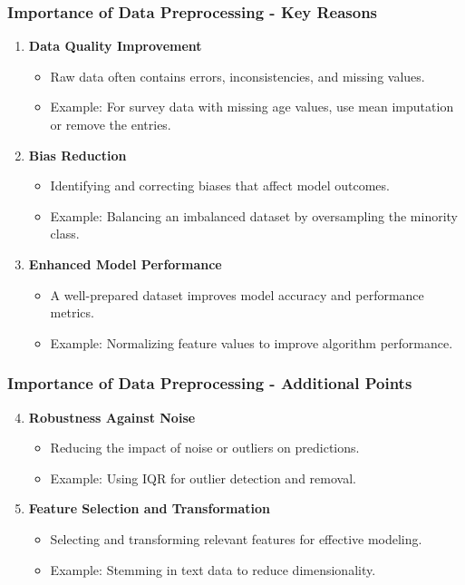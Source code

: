 \documentclass{beamer}
\begin{document}
\begin{frame}[fragile]
    \frametitle{Importance of Data Preprocessing - Key Reasons}
    \begin{enumerate}
        \item \textbf{Data Quality Improvement}
        \begin{itemize}
            \item Raw data often contains errors, inconsistencies, and missing values.
            \item Example: For survey data with missing age values, use mean imputation or remove the entries.
        \end{itemize}

        \item \textbf{Bias Reduction}
        \begin{itemize}
            \item Identifying and correcting biases that affect model outcomes.
            \item Example: Balancing an imbalanced dataset by oversampling the minority class.
        \end{itemize}
        
        \item \textbf{Enhanced Model Performance}
        \begin{itemize}
            \item A well-prepared dataset improves model accuracy and performance metrics.
            \item Example: Normalizing feature values to improve algorithm performance.
        \end{itemize}
    \end{enumerate}
\end{frame}

\begin{frame}[fragile]
    \frametitle{Importance of Data Preprocessing - Additional Points}
    \begin{enumerate}
        \setcounter{enumi}{3}
        \item \textbf{Robustness Against Noise}
        \begin{itemize}
            \item Reducing the impact of noise or outliers on predictions.
            \item Example: Using IQR for outlier detection and removal.
        \end{itemize}

        \item \textbf{Feature Selection and Transformation}
        \begin{itemize}
            \item Selecting and transforming relevant features for effective modeling.
            \item Example: Stemming in text data to reduce dimensionality.
        \end{itemize}
    \end{enumerate}
\end{frame}
\end{document}
